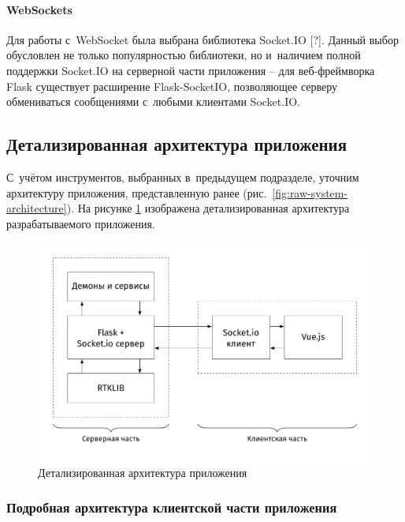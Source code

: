 \paragraph{WebSockets}

Для работы с~WebSocket была выбрана библиотека Socket.IO [?]. Данный выбор обусловлен не только популярностью библиотеки, но и~наличием полной поддержки Socket.IO на серверной части приложения -- для веб-фреймворка Flask существует расширение Flask-SocketIO, позволяющее серверу обмениваться сообщениями с~любыми клиентами Socket.IO.


\subsection{Детализированная архитектура приложения}
\label{subsec:app-architecture}

С~учётом инструментов, выбранных в~предыдущем подразделе, уточним архитектуру приложения, представленную ранее (рис.~\ref{fig:raw-system-architecture}). На рисунке \ref{fig:complete-system-architecture} изображена детализированная архитектура разрабатываемого приложения.

\begin{figure}[h!]
  \centering
  \setlength{\fboxsep}{5pt}
  \includegraphics[width=.9\textwidth]{img/tikz/system-architecture/pic_sans_no-border}
  \caption{Детализированная архитектура приложения}\label{fig:complete-system-architecture}
\end{figure}


\subsubsection{Подробная архитектура клиентской части приложения}
\label{subsec:frontend-architecture}

